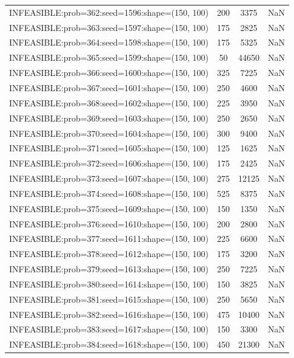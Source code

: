 \begin{longtable}{lccc}
INFEASIBLE:prob=362:seed=1596:shape=(150, 100) &      200 &  3375 &    NaN \\
INFEASIBLE:prob=363:seed=1597:shape=(150, 100) &      175 &  2825 &    NaN \\
INFEASIBLE:prob=364:seed=1598:shape=(150, 100) &      175 &  5325 &    NaN \\
INFEASIBLE:prob=365:seed=1599:shape=(150, 100) &       50 & 44650 &    NaN \\
INFEASIBLE:prob=366:seed=1600:shape=(150, 100) &      325 &  7225 &    NaN \\
INFEASIBLE:prob=367:seed=1601:shape=(150, 100) &      250 &  4600 &    NaN \\
INFEASIBLE:prob=368:seed=1602:shape=(150, 100) &      225 &  3950 &    NaN \\
INFEASIBLE:prob=369:seed=1603:shape=(150, 100) &      250 &  2650 &    NaN \\
INFEASIBLE:prob=370:seed=1604:shape=(150, 100) &      300 &  9400 &    NaN \\
INFEASIBLE:prob=371:seed=1605:shape=(150, 100) &      125 &  1625 &    NaN \\
INFEASIBLE:prob=372:seed=1606:shape=(150, 100) &      175 &  2425 &    NaN \\
INFEASIBLE:prob=373:seed=1607:shape=(150, 100) &      275 & 12125 &    NaN \\
INFEASIBLE:prob=374:seed=1608:shape=(150, 100) &      525 &  8375 &    NaN \\
INFEASIBLE:prob=375:seed=1609:shape=(150, 100) &      150 &  1350 &    NaN \\
INFEASIBLE:prob=376:seed=1610:shape=(150, 100) &      200 &  2800 &    NaN \\
INFEASIBLE:prob=377:seed=1611:shape=(150, 100) &      225 &  6600 &    NaN \\
INFEASIBLE:prob=378:seed=1612:shape=(150, 100) &      175 &  3200 &    NaN \\
INFEASIBLE:prob=379:seed=1613:shape=(150, 100) &      250 &  7225 &    NaN \\
INFEASIBLE:prob=380:seed=1614:shape=(150, 100) &      150 &  3825 &    NaN \\
INFEASIBLE:prob=381:seed=1615:shape=(150, 100) &      250 &  5650 &    NaN \\
INFEASIBLE:prob=382:seed=1616:shape=(150, 100) &      475 & 10400 &    NaN \\
INFEASIBLE:prob=383:seed=1617:shape=(150, 100) &      150 &  3300 &    NaN \\
INFEASIBLE:prob=384:seed=1618:shape=(150, 100) &      450 & 21300 &    NaN \\

\end{longtable}
